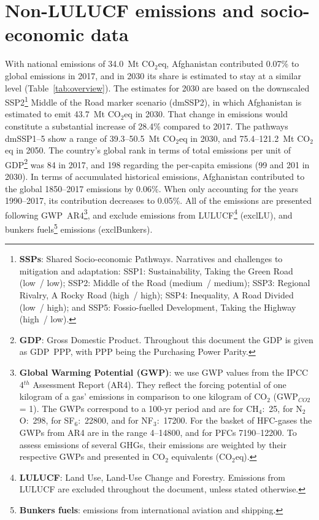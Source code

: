 \documentclass[12pt]{article}
\begin{document}
 \section{Non-LULUCF emissions and socio-economic data}
 \label{sec:nonLULUCFSocioEco}
 With national emissions of 34.0~Mt CO$_2$eq, Afghanistan contributed 0.07\% to global emissions in 2017, and in 2030 its share is estimated to stay at a similar level (Table~\ref{tab:overview}).
 The estimates for 2030 are based on the downscaled SSP2\footnote{\textbf{SSPs}: Shared Socio-economic Pathways.
 Narratives and challenges to mitigation and adaptation: 
 SSP1: Sustainability, Taking the Green Road (low~/ low);
 SSP2: Middle of the Road (medium~/ medium);
 SSP3: Regional Rivalry, A Rocky Road (high~/ high);
 SSP4: Inequality, A Road Divided (low~/ high); and
 SSP5: Fossio-fuelled Development, Taking the Highway (high~/ low).} Middle of the Road marker scenario (dmSSP2), in which Afghanistan is estimated to emit 43.7~Mt CO$_2$eq in 2030.
 That change in emissions would constitute a substantial increase of 28.4\% compared to 2017. 
 The pathways dmSSP1--5 show a range of 39.3--50.5~Mt CO$_2$eq in 2030, and 75.4--121.2~Mt CO$_2$eq in 2050.
 The country's global rank in terms of total emissions per unit of GDP\footnote{\textbf{GDP}: Gross Domestic Product. 
 Throughout this document the GDP is given as GDP~PPP, with PPP being the Purchasing Power Parity.} was 84 in 2017, and 198 regarding the per-capita emissions (99 and 201 in 2030).
 In terms of accumulated historical emissions, Afghanistan contributed to the global 1850--2017 emissions by 0.06\%. 
 When only accounting for the years 1990--2017, its contribution decreases to 0.05\%.
 All of the emissions are presented following GWP~AR4\footnote{\textbf{Global Warming Potential (GWP)}: we use GWP values from the IPCC 4$^{th}$ Assessment Report (AR4). 
 They reflect the forcing potential of one kilogram of a gas' emissions in comparison to one kilogram of CO$_2$ (GWP$_{CO2}$ = 1). 
 The GWPs correspond to a 100-yr period and are for CH$_4$:~25, for N$_2$O:~298, for SF$_6$:~22800, and for NF$_3$:~17200. 
 For the basket of HFC-gases the GWPs from AR4 are in the range 4--14800, and for PFCs 7190--12200. 
 To assess emissions of several GHGs, their emissions are weighted by their respective GWPs and presented in CO$_2$ equivalents (CO$_2$eq).}, and exclude emissions from LULUCF\footnote{\textbf{LULUCF}: Land Use, Land-Use Change and Forestry. 
 Emissions from LULUCF are excluded throughout the document, unless stated otherwise.} (exclLU), and bunkers fuels\footnote{\textbf{Bunkers fuels}: emissions from international aviation and shipping.} emissions (exclBunkers).
\end{document}
